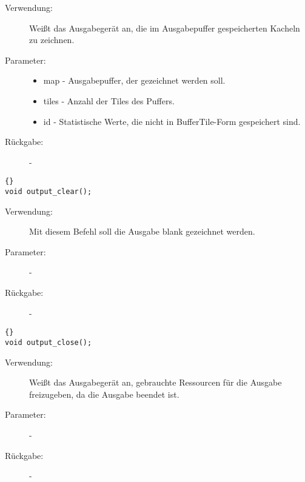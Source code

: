 \documentclass[11pt,a4paper,notitlepage]{report}
\begin{document}
	\begin{description}
		\item[Verwendung:] Weißt das Ausgabegerät an, die im Ausgabepuffer gespeicherten Kacheln zu zeichnen.
		\item[Parameter:] \hfill
		\begin{itemize}
			\item map - Ausgabepuffer, der gezeichnet werden soll.
			\item tiles - Anzahl der Tiles des Puffers.
			\item id - Statistische Werte, die nicht in BufferTile-Form gespeichert sind.
		\end{itemize}
		\item[Rückgabe:] -
	\end{description}
	
		\begin{lstlisting}[caption=output\_clear]{}
void output_clear();
		\end{lstlisting}
		
	\begin{description}
		\item[Verwendung:] Mit diesem Befehl soll die Ausgabe blank gezeichnet werden.
		\item[Parameter:] -
		\item[Rückgabe:] -
	\end{description}
	
		\begin{lstlisting}[caption=output\_close]{}
void output_close();
		\end{lstlisting}
		
	\begin{description}
		\item[Verwendung:] Weißt das Ausgabegerät an, gebrauchte Ressourcen für die Ausgabe freizugeben, da die Ausgabe beendet ist.
		\item[Parameter:] -
		\item[Rückgabe:] -
	\end{description}

		
	\newpage
\end{document}
